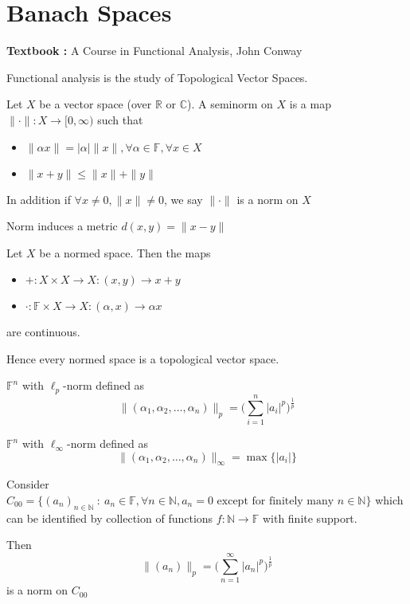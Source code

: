 
\chapter{Banach Spaces}

\textbf{Textbook :} A Course in Functional Analysis, John Conway

Functional analysis is the study of Topological Vector Spaces.

\begin{definition}
  Let $X$ be a vector space (over $\mathbb{R}$ or $\mathbb{C}$). A
  seminorm on $X$ is a map $\|\cdot \|: X \to [0, \infty)$ such that
  \begin{itemize}
    \item  $\|\alpha x\| = |\alpha|\| x \|, \forall \alpha \in
      \mathbb{F}, \forall x \in X$
    \item $\|x+y\| \le \|x\| + \|y\|$
  \end{itemize}
  In addition if $\forall x\neq 0, \|x\| \neq 0$, we say $\|\cdot\|$
  is a norm on $X$
\end{definition}

Norm induces a metric $ d(x, y) = \|x-y\|$

\begin{note}
  Let $X$ be a normed space. Then the maps
  \begin{itemize}
    \item $+: X \times X \to X : (x, y) \to x+y$
    \item $\cdot: \mathbb{F} \times X \to X: (\alpha, x) \to \alpha x$
  \end{itemize}
  are continuous.
\end{note}

Hence every normed space is a topological vector space.

\begin{example}
  $\mathbb{F}^n$ with $\ell_p$-norm defined as \[
    \|(\alpha_1, \alpha_2, \ldots, \alpha_n)\|_p = \Big(\sum_{i =
    1}^{n} |a_i|^p\Big)^{ \frac{1}{p} }
  \]
\end{example}

\begin{example}
  $\mathbb{F}^n$ with $\ell_\infty$-norm defined as \[
    \|(\alpha_1, \alpha_2, \ldots, \alpha_n)\|_\infty = \max \{ |a_i| \}
  \]
\end{example}

\begin{example}
  Consider $C_{00} = \{ (a_n)_{n \in \mathbb{N}}  \ : \   a_n \in
    \mathbb{F}, \forall n \in \mathbb{N}, a_n = 0  \textrm{ except for
  finitely many }  n \in \mathbb{N}\}$ which can be identified by
  collection of functions $  f: \mathbb{N} \to \mathbb{F}$ with finite support.

  Then $$\|(a_n)\|_p = \Big(\sum_{n = 1}^{\infty} |a_n|^p\Big)^{ \frac{1}{p} }$$
  is a norm on $C_{00}$
\end{example}

